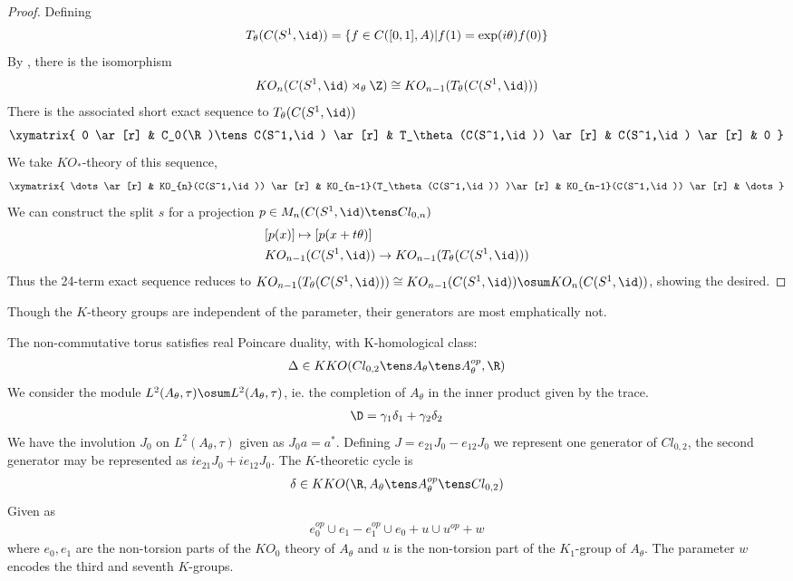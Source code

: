 \begin{proof}
	Defining
\begin{align*}
	T_\theta(C(S^1,\id))=\{f\in C([0,1],A) | f(1)=\exp(i\theta)f(0) \}
\end{align*}
By \cite[1.36]{schroder}, there is the isomorphism
\begin{align*}
	KO_n(C(S^1,\id)\rtimes_\theta \Z) \cong KO_{n-1}(T_\theta(C(S^1,\id)))
\end{align*}
There is the associated short exact sequence to $T_\theta(C(S^1,\id))$
\begin{align*}
	\xymatrix{ 
		0 \ar[r] & C_0(\R)\tens C(S^1,\id) \ar[r] &  T_\theta(C(S^1,\id)) \ar[r] & C(S^1,\id) \ar[r] & 0 
	}
\end{align*}
We take $KO_*$-theory of this sequence,
\begin{align*}
\xymatrix{
	\dots \ar[r] & KO_{n}(C(S^1,\id)) \ar[r] &  KO_{n-1}(T_\theta(C(S^1,\id)) )\ar[r] & KO_{n-1}(C(S^1,\id)) \ar[r] & \dots
	}
\end{align*}
We can construct the split $s$ for a projection $p\in M_n(C(S^1,\id)\tens Cl_{0,n})$
\begin{align*}
&[p(x)]\mapsto [p(x+t\theta)] \\
&KO_{n-1}(C(S^1,\id))\to  KO_{n-1}( T_\theta(C(S^1,\id)) )
\end{align*}
Thus the 24-term exact sequence reduces to $KO_{n-1}(T_\theta(C(S^1,\id)))\cong KO_{n-1}(C(S^1,\id)) \osum KO_n(C(S^1,\id))$, showing the desired. 
\end{proof}
\begin{remark}
	Though the $K$-theory groups are independent of the parameter, their generators are most emphatically not. 
\end{remark}
\begin{conjecture}
	The non-commutative torus satisfies real Poincare duality, with K-homological class: 
	\begin{align*}
		\Delta \in KKO(Cl_{0,2} \tens A_\theta \tens A_\theta^{op},\R)
	\end{align*}
	We consider the module $L^2(A_\theta, \tau) \osum L^2(A_\theta,\tau)$, ie. the completion of $A_\theta$ in the inner product given by the trace. 
	\begin{align*}
		\D=\gamma_1\delta_1+\gamma_2 \delta_2
	\end{align*}
	We have the involution $J_0$ on $L^2(A_\theta, \tau)$ given as $J_0a=a^*$. Defining $J=e_{21}J_0-e_{12}J_0$ we represent one generator of $Cl_{0,2}$, the second generator may be represented as $ie_{21}J_0+ie_{12}J_0$.
	The $K$-theoretic cycle is 
	\begin{align*}
		\delta \in KKO(\R,A_\theta \tens A_\theta^{op} \tens Cl_{0,2})
	\end{align*}
	Given as 
	\begin{align*}
		e_0^{op}\cup e_1 - e_1^{op} \cup e_0 +u\cup u^{op}+w
	\end{align*}
	where $e_0,e_1$ are the non-torsion parts of the $KO_0$ theory of $A_\theta$ and $u$ is the non-torsion part of the $K_1$-group of $A_\theta$. The parameter $w$ encodes the third and seventh $K$-groups.
\end{conjecture}
